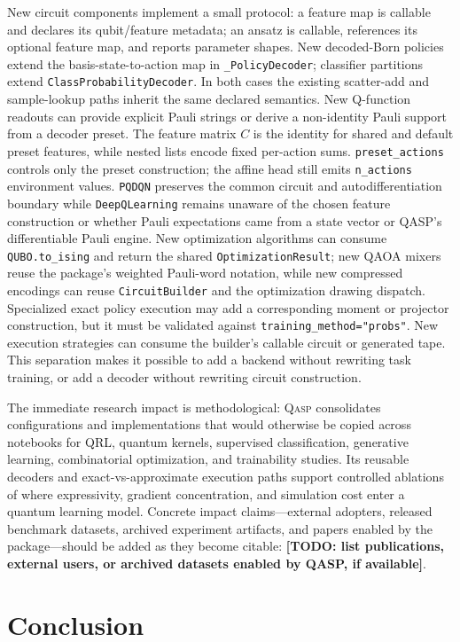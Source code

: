 \documentclass[10pt]{article}
\newcommand{\qasp}{\textsc{Qasp}}
\newcommand{\todo}[1]{\textcolor{red!75!black}{\textbf{[TODO: #1]}}}
\newcommand{\code}[1]{\texttt{#1}}
\begin{document}
New circuit components implement a small protocol: a feature map is callable
and declares its qubit/feature metadata; an ansatz is callable, references its
optional feature map, and reports parameter shapes.  New decoded-Born policies
extend the basis-state-to-action map in \code{\_PolicyDecoder}; classifier
partitions extend \code{ClassProbabilityDecoder}.  In both cases the existing
scatter-add and sample-lookup paths inherit the same declared semantics.
New Q-function readouts can provide explicit Pauli strings or derive a
non-identity Pauli support from a decoder preset.  The feature matrix $C$ is
the identity for shared and default preset features, while nested lists encode
fixed per-action sums.  \code{preset\_actions} controls only the preset
construction; the affine head still emits \code{n\_actions} environment
values.  \code{PQDQN} preserves the common circuit and autodifferentiation
boundary while \code{DeepQLearning} remains unaware of the chosen feature
construction or whether Pauli expectations came from a state vector or QASP's
differentiable Pauli engine.
New optimization algorithms can consume \code{QUBO.to\_ising} and return the
shared \code{OptimizationResult}; new QAOA mixers reuse the package's weighted
Pauli-word notation, while new compressed encodings can reuse
\code{CircuitBuilder} and the optimization drawing dispatch.
Specialized exact policy execution may add a corresponding moment or projector
construction, but it must be validated against
\code{training\_method="probs"}.  New execution strategies can consume the
builder's callable circuit or generated tape.  This separation makes it
possible to add a backend without rewriting task training, or add a decoder
without rewriting circuit construction.

The immediate research impact is methodological: \qasp{} consolidates
configurations and implementations that would otherwise be copied across
notebooks for QRL, quantum kernels, supervised classification, generative
learning, combinatorial optimization, and trainability studies.  Its reusable decoders and
exact-vs-approximate execution paths support controlled ablations of where
expressivity, gradient concentration, and simulation cost enter a quantum
learning model.  Concrete impact claims---external adopters, released
benchmark datasets, archived experiment artifacts, and papers enabled by the
package---should be added as they become citable: \todo{list publications,
external users, or archived datasets enabled by QASP, if available}.

\section{Conclusion}
\label{sec:conclusion}
\end{document}
